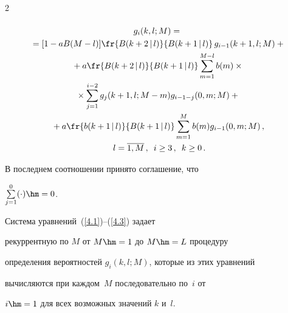 \begin{multicols}{2}
\begin{multline}
\end{multline}





\vspace*{-12pt}





\noindent


\begin{multline}


\label{4.3}


g_i(k,l;M) ={}\\


{}= [1 - a B(M-l)] \fr{B(k+2\,|\,l) }{ B(k+1\,|\,l)}


\, g_{i-1}(k+1,l;M)  +{}


\\


{}+


a \fr{B(k+2\,|\,l) }{ B(k+1\,|\,l)} \sum\limits_{m=1}^{M-l}


b(m) \times{}\\


{}\times


\sum\limits_{j=1}^{i-2} g_{j}(k+1,l;M-m)


g_{i-1-j}(0,m;M)  +{}\\


{}+


a \fr{b(k+1\,|\,l) }{ B(k+1\,|\,l)} \sum\limits_{m=1}^M


b(m) g_{i-1}(0,m;M)\,,\\


\  l= \overline{1,M}\,,\enskip  i\ge 3\,,\enskip  k\ge 0\,.


\end{multline}




В последнем соотношении принято соглашение, что


$\sum\limits_{j=1}^{0} (\cdot) \hm= 0$.





Система уравнений~(\ref{4.1})--(\ref{4.3}) задает


рекуррентную по $M$ от $M\hm=1$ до $M\hm=L$ процедуру


определения вероятностей $g_i(k,l;M)$, которые из этих уравнений


вычисляются при каждом~$M$ последовательно по~$i$ от


$i\hm=1$ для всех возможных значений $k$ и~$l$.






\end{multicols}
